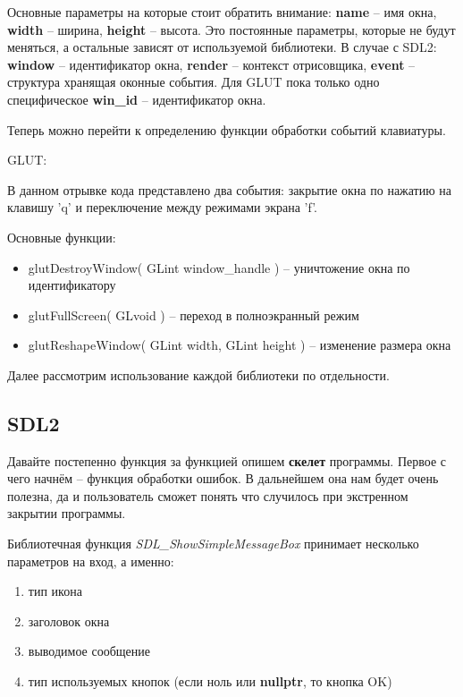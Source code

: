 Основные параметры на которые стоит обратить внимание: \textbf{name} -- имя окна, \textbf{width} -- ширина, 
\textbf{height} -- высота. Это постоянные параметры, которые не будут меняться, а остальные зависят от 
используемой библиотеки. В случае с SDL2: \textbf{window} -- идентификатор окна, \textbf{render} -- контекст 
отрисовщика, \textbf{event} -- структура хранящая оконные события. Для GLUT пока только одно специфическое 
\textbf{win\_id} -- идентификатор окна.

Теперь можно перейти к определению функции обработки событий клавиатуры.

GLUT:


В данном отрывке кода представлено два события: закрытие окна по нажатию на клавишу 'q' и переключение между 
режимами экрана 'f'.

Основные функции:
\begin{itemize}
    \item glutDestroyWindow( GLint window\_handle ) -- уничтожение окна по идентификатору
    \item glutFullScreen( GLvoid ) -- переход в полноэкранный режим
    \item glutReshapeWindow( GLint width, GLint height ) -- изменение размера окна
\end{itemize}

Далее рассмотрим использование каждой библиотеки по отдельности.

\pagebreak

\subsection{SDL2}
Давайте постепенно функция за функцией опишем \textbf{скелет} программы. Первое с чего начнём -- функция 
обработки ошибок. В дальнейшем она нам будет очень полезна, да и пользователь сможет понять что случилось при 
экстренном закрытии программы.



Библиотечная функция \emph{SDL\_ShowSimpleMessageBox} принимает несколько параметров на вход, а именно:
\begin{enumerate}
    \item тип икона
    \item заголовок окна
    \item выводимое сообщение
    \item тип используемых кнопок (если ноль или \textbf{nullptr}, то кнопка OK)
\end{enumerate}

